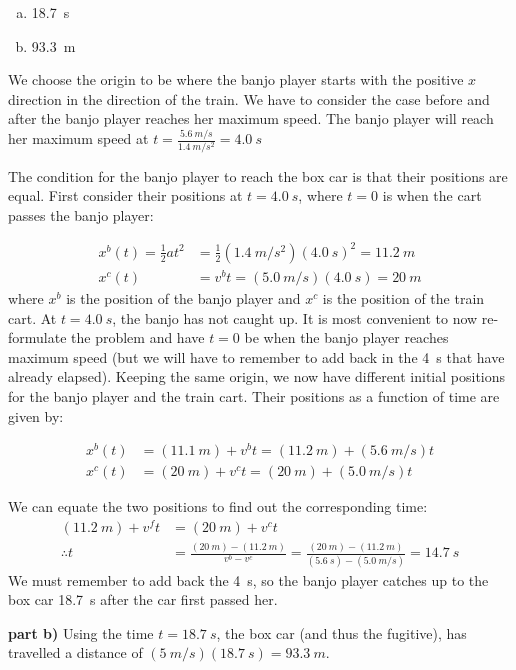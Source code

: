 \begin{finalanswer}
\begin{enumerate}[(a)]
\item \SI{18.7}{s}
\item \SI{93.3}{m}
\end{enumerate}
\end{finalanswer}
\begin{solution}
We choose the origin to be where the banjo player starts with the positive $x$ direction in the direction of the train. We have to consider the case before and after the banjo player reaches her maximum speed. The banjo player will reach her maximum speed at $t=\frac{\SI{5.6}{m/s}}{\SI{1.4}{m/s^2}}=\SI{4.0}{s}$

The condition for the banjo player to reach the box car is that their positions are equal. First consider their positions at $t=\SI{4.0}{s}$, where $t=0$ is when the cart passes the banjo player:

\begin{align*}
x^b(t)=\frac{1}{2}at^2&=\frac{1}{2}(\SI{1.4}{m/s^2})(\SI{4.0}{s})^2=\SI{11.2}{m}\\
x^c(t)&=v^bt=(\SI{5.0}{m/s})(\SI{4.0}{s})=\SI{20}{m}
\end{align*}
where $x^b$ is the position of the banjo player and $x^c$ is the position of the train cart. At $t=\SI{4.0}{s}$, the banjo has not caught up. It is most convenient to now re-formulate the problem and have $t=0$ be when the banjo player reaches maximum speed (but we will have to remember to add back in the \SI{4}{s} that have already elapsed). Keeping the same origin, we now have different initial positions for the banjo player and the train cart. Their positions as a function of time are given by:

\begin{align*}
x^b(t)&=(\SI{11.1}{m})+v^bt=(\SI{11.2}{m})+(\SI{5.6}{m/s})t\\
x^c(t)&=(\SI{20}{m})+v^ct=(\SI{20}{m})+(\SI{5.0}{m/s})t
\end{align*}

We can equate the two positions to find out the corresponding time:
\begin{align*}
(\SI{11.2}{m})+v^f t&= (\SI{20}{m})+v^ct\\
\therefore t&= \frac{(\SI{20}{m})-(\SI{11.2}{m})}{v^b-v^c}=\frac{(\SI{20}{m})-(\SI{11.2}{m})}{(\SI{5.6}{s})-(\SI{5.0}{m/s})}=\SI{14.7}{s}
\end{align*}
We must remember to add back the \SI{4}{s}, so the banjo player catches up to the box car \SI{18.7}{s} after the car first passed her.

\textbf{part b)} Using the time $t=\SI{18.7}{s}$, the box car (and thus the fugitive), has travelled a distance of $(\SI{5}{m/s})(\SI{18.7}{s})=\SI{93.3}{m}$.
\end{solution}



